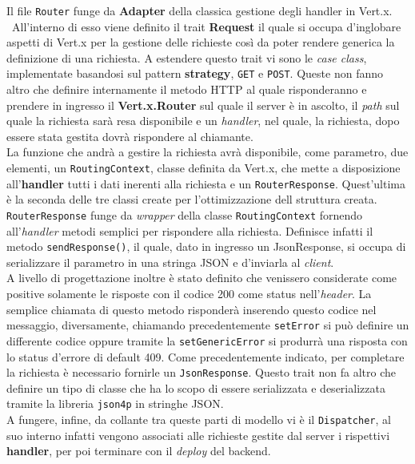 	  Il file \texttt{Router} funge da \textbf{Adapter} della classica gestione degli handler in Vert.x.\\\
	  All'interno di esso viene definito il trait \textbf{Request} il quale si occupa d'inglobare aspetti di Vert.x per la gestione delle richieste così da poter rendere generica la definizione di una richiesta.
	  A estendere questo trait vi sono le \textit{case class}, implementate basandosi sul pattern \textbf{strategy}, \texttt{GET} e \texttt{POST}. Queste non fanno altro che definire internamente il metodo HTTP al quale risponderanno e prendere in ingresso il \textbf{Vert.x.Router} sul quale il server è in ascolto, il \textit{path} sul quale la richiesta sarà resa disponibile e un \textit{handler}, nel quale, la richiesta, dopo essere stata gestita dovrà rispondere al chiamante. \\
	  La funzione che andrà a gestire la richiesta avrà disponibile, come parametro, due elementi, un \texttt{RoutingContext}, classe definita da Vert.x, che mette a disposizione all'\textbf{handler} tutti i dati inerenti alla richiesta e un \texttt{RouterResponse}.
	  Quest'ultima è la seconda delle tre classi create per l'ottimizzazione dell struttura creata. 
	  \\
	  \texttt{RouterResponse} funge da \textit{wrapper} della classe \texttt{RoutingContext} fornendo all'\textit{handler} metodi semplici per rispondere alla richiesta. Definisce infatti il metodo \texttt{sendResponse()}, il quale, dato in ingresso un JsonResponse, si occupa di serializzare il parametro in una stringa JSON e d'inviarla al \textit{client}. 
	  \\
	  A livello di progettazione inoltre è stato definito che venissero considerate come positive solamente le risposte con il codice 200 come status nell'\textit{header}. La semplice chiamata di questo metodo risponderà inserendo questo codice nel messaggio, diversamente, chiamando precedentemente \texttt{setError} si può definire un differente codice oppure tramite la \texttt{setGenericError} si produrrà una risposta con lo status d'errore di default 409.
	  Come precedentemente indicato, per completare la richiesta è necessario fornirle un \texttt{JsonResponse}. Questo trait non fa altro che definire un tipo di classe che ha lo scopo di essere serializzata e deserializzata tramite la libreria \texttt{json4p} in stringhe JSON. \\
	  A fungere, infine, da collante tra queste parti di modello vi è il \texttt{Dispatcher}, al suo interno infatti vengono associati alle richieste gestite dal server i rispettivi \textbf{handler}, per poi terminare con il \textit{deploy} del backend.
      
